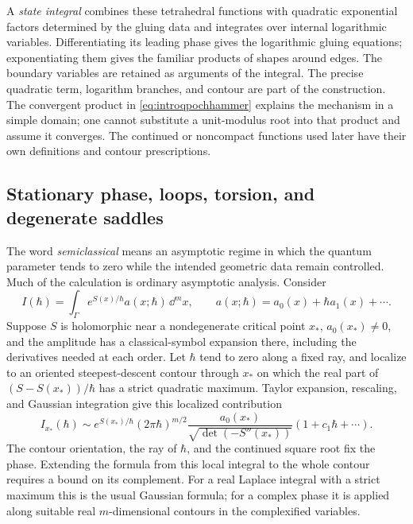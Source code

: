 A \emph{state integral} combines these tetrahedral functions with
quadratic exponential factors determined by the gluing data and
integrates over internal logarithmic variables. Differentiating its
leading phase gives the logarithmic gluing equations; exponentiating
them gives the familiar products of shapes around edges. The
boundary variables are retained as arguments of the integral.
The precise quadratic term, logarithm branches, and contour are
part of the construction. The convergent product in
\eqref{eq:introqpochhammer} explains the mechanism in a simple
domain; one cannot substitute a unit-modulus root into that product
and assume it converges. The continued or noncompact functions used
later have their own definitions and contour prescriptions.
\subsection{Stationary phase, loops, torsion, and degenerate saddles}
\label{sec:introsemiclassical}

The word \emph{semiclassical} means an asymptotic regime in which
the quantum parameter tends to zero while the intended geometric
data remain controlled. Much of the calculation is ordinary
asymptotic analysis. Consider
\begin{equation}
 I(\hbar)=\int_\Gamma e^{S(x)/\hbar}
                 a(x;\hbar)\,\dd^m x,
 \qquad a(x;\hbar)=a_0(x)+\hbar a_1(x)+\cdots.
 \label{eq:introsaddleintegral}
\end{equation}
Suppose $S$ is holomorphic near a nondegenerate critical point
$x_*$, $a_0(x_*)\ne0$, and the amplitude has a classical-symbol
expansion there, including the derivatives needed at each order.
Let $\hbar$ tend to zero along a fixed ray, and localize to an
oriented steepest-descent contour through $x_*$ on which the real
part of $(S-S(x_*))/\hbar$ has a strict quadratic maximum.
Taylor expansion, rescaling, and Gaussian integration give this
localized contribution
\begin{equation}
 I_{x_*}(\hbar)\sim
 e^{S(x_*)/\hbar}(2\pi\hbar)^{m/2}
 \frac{a_0(x_*)}{\sqrt{\det(-S''(x_*))}}
 (1+c_1\hbar+\cdots).
 \label{eq:introgaussian}
\end{equation}
The contour orientation, the ray of $\hbar$, and the continued
square root fix the phase. Extending the formula from this local
integral to the whole contour requires a bound on its complement.
For a real
Laplace integral with a strict maximum this is the usual Gaussian
formula; for a complex phase it is applied along suitable real
$m$-dimensional contours in the complexified variables.

